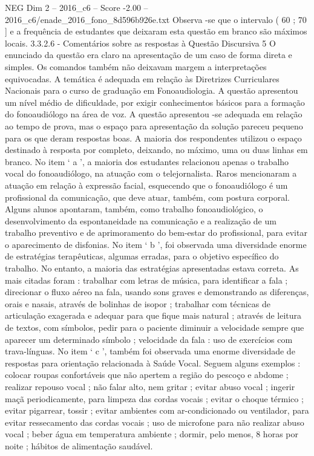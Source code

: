 \begin{textsample}{NEG Dim 2 – 2016\_c6 – Score -2.00 – 2016\_c6/enade\_2016\_fono\_8d596b926e.txt}
Observa -se que o intervalo ( 60 ; 70 ] e a frequência de estudantes que deixaram esta questão em branco são máximos locais. 3.3.2.6 - Comentários sobre as respostas à Questão Discursiva 5 O enunciado da questão era claro na apresentação de um caso de forma direta e simples.
Os comandos também não deixavam margem a interpretações equivocadas.
A temática é adequada em relação às Diretrizes Curriculares Nacionais para o curso de graduação em Fonoaudiologia.
A questão apresentou um nível médio de dificuldade, por exigir conhecimentos básicos para a formação do fonoaudiólogo na área de voz.
A questão apresentou -se adequada em relação ao tempo de prova, mas o espaço para apresentação da solução pareceu pequeno para os que deram respostas boas.
A maioria dos respondentes utilizou o espaço destinado à resposta por completo, deixando, no máximo, uma ou duas linhas em branco.
No item ‘ a ’, a maioria dos estudantes relacionou apenas o trabalho vocal do fonoaudiólogo, na atuação com o telejornalista.
Raros mencionaram a atuação em relação à expressão facial, esquecendo que o fonoaudiólogo é um profissional da comunicação, que deve atuar, também, com postura corporal.
Alguns alunos apontaram, também, como trabalho fonoaudiológico, o desenvolvimento da espontaneidade na comunicação e a realização de um trabalho preventivo e de aprimoramento do bem-estar do profissional, para evitar o aparecimento de disfonias.
No item ‘ b ’, foi observada uma diversidade enorme de estratégias terapêuticas, algumas erradas, para o objetivo específico do trabalho.
No entanto, a maioria das estratégias apresentadas estava correta.
As mais citadas foram : trabalhar com letras de música, para identificar a fala ; direcionar o fluxo aéreo na fala, usando sons graves e demonstrando as diferenças, orais e nasais, através de bolinhas de isopor ; trabalhar com técnicas de articulação exagerada e adequar para que fique mais natural ; através de leitura de textos, com símbolos, pedir para o paciente diminuir a velocidade sempre que aparecer um determinado símbolo ; velocidade da fala : uso de exercícios com trava-línguas.
No item ‘ c ’, também foi observada uma enorme diversidade de respostas para orientação relacionada à Saúde Vocal.
Seguem alguns exemplos : colocar roupas confortáveis que não apertem a região do pescoço e abdome ; realizar repouso vocal ; não falar alto, nem gritar ; evitar abuso vocal ; ingerir maçã periodicamente, para limpeza das cordas vocais ; evitar o choque térmico ; evitar pigarrear, tossir ; evitar ambientes com ar-condicionado ou ventilador, para evitar ressecamento das cordas vocais ; uso de microfone para não realizar abuso vocal ; beber água em temperatura ambiente ; dormir, pelo menos, 8 horas por noite ; hábitos de alimentação saudável.

\end{textsample}
